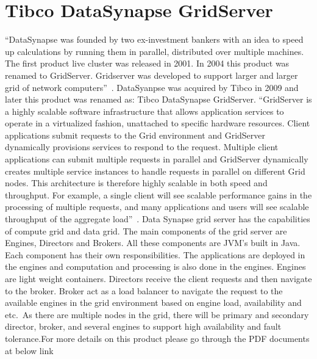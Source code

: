 \section{Tibco DataSynapse GridServer}

“DataSynapse was founded by two ex-investment bankers with an idea to speed up calculations by running them in parallel, 
distributed over multiple machines. The first product live cluster was released in 2001. 
In 2004 this product was renamed to GridServer. Gridserver was developed to support larger 
and larger grid of network computers”~\cite{hid-sp18-514-datasynapsewiki}.
DataSyanpse was acquired by Tibco in 2009 and later this product was renamed as: 
Tibco DataSynapse GridServer\cite{hid-sp18-514-tibcodatasynapsewiki}.
“GridServer is a highly scalable software infrastructure that allows application services to operate in a virtualized fashion, 
unattached to specific hardware resources. Client applications submit requests to the Grid environment 
and GridServer dynamically provisions services to respond to the request. 
Multiple client applications can submit multiple requests in parallel and GridServer dynamically 
creates multiple service instances to handle requests in parallel on different Grid nodes. 
This architecture is therefore highly scalable in both speed and throughput. For example, 
a single client will see scalable performance gains in the processing of multiple requests, 
and many applications and users will see scalable throughput of the aggregate load”~\cite{hid-sp18-514-tibcods}.
Data Synapse grid server has the capabilities of compute grid and data grid. The main components of the grid server are Engines, 
Directors and Brokers. All these components are JVM’s built in Java.  
Each component has their own responsibilities. The applications are deployed in the engines and computation and processing 
is also done in the engines. Engines are light weight containers. Directors receive the client requests 
and then navigate to the broker. Broker act as a load balancer to navigate the request to the available engines 
in the grid environment based on engine load, availability and etc.\ As there are multiple nodes in the grid, 
there will be primary and secondary director, broker, and several engines to support high availability 
and fault tolerance\cite{hid-sp18-514-tibcods}.For more details on this product 
please go through the PDF documents at below link

